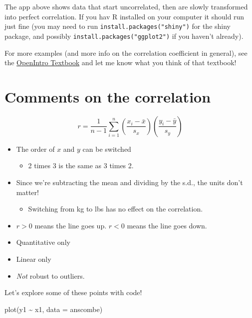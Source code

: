 \documentclass[
  letterpaper,
  DIV=11,
  numbers=noendperiod]{scrreprt}
\newenvironment{Shaded}{\begin{snugshade}}{\end{snugshade}}
\newcommand{\AttributeTok}[1]{\textcolor[rgb]{0.40,0.45,0.13}{#1}}
\newcommand{\FunctionTok}[1]{\textcolor[rgb]{0.28,0.35,0.67}{#1}}
\newcommand{\NormalTok}[1]{\textcolor[rgb]{0.00,0.23,0.31}{#1}}
\newcommand{\SpecialCharTok}[1]{\textcolor[rgb]{0.37,0.37,0.37}{#1}}
\providecommand{\tightlist}{%
  \setlength{\itemsep}{0pt}\setlength{\parskip}{0pt}}\usepackage{longtable,booktabs,array}
\begin{document}
The app above shows data that start uncorrelated, then are slowly
transformed into perfect correlation. If you hav R installed on your
computer it should run just fine (you may need to run
\texttt{install.packages("shiny")} for the shiny package, and possibly
\texttt{install.packages("ggplot2")} if you haven't already).

For more examples (and more info on the correlation coefficient in
general), see the
\href{https://www.openintro.org/book/biostat/}{OpenIntro Textbook} and
let me know what you think of that textbook!

\hypertarget{comments-on-the-correlation}{%
\section{Comments on the
correlation}\label{comments-on-the-correlation}}

\[
r = \frac{1}{n-1}\sum_{i=1}^n\left(\frac{x_i - \bar x}{s_x}\right)\left(\frac{y_i - \bar y}{s_y}\right)
\]

\begin{itemize}
\tightlist
\item
  The order of \(x\) and \(y\) can be switched

  \begin{itemize}
  \tightlist
  \item
    2 times 3 is the same as 3 times 2.\lspace
  \end{itemize}
\item
  Since we're subtracting the mean and dividing by the s.d., the units
  don't matter!

  \begin{itemize}
  \tightlist
  \item
    Switching from kg to lbs has no effect on the correlation.\lspace
  \end{itemize}
\item
  \(r>0\) means the line goes up. \(r < 0\) means the line goes
  down.\lspace
\item
  Quantitative only
\item
  Linear only
\item
  \emph{Not} robust to outliers.
\end{itemize}

Let's explore some of these points with code!

\begin{Shaded}
\begin{Highlighting}[]
\FunctionTok{plot}\NormalTok{(y1 }\SpecialCharTok{\textasciitilde{}}\NormalTok{ x1, }\AttributeTok{data =}\NormalTok{ anscombe)}
\end{Highlighting}
\end{Shaded}
\end{document}
